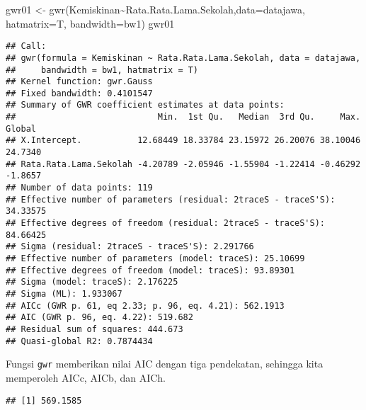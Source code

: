 \documentclass[
]{book}
\newenvironment{Shaded}{\begin{snugshade}}{\end{snugshade}}
\newcommand{\AttributeTok}[1]{\textcolor[rgb]{0.77,0.63,0.00}{#1}}
\newcommand{\FunctionTok}[1]{\textcolor[rgb]{0.00,0.00,0.00}{#1}}
\newcommand{\NormalTok}[1]{#1}
\newcommand{\OtherTok}[1]{\textcolor[rgb]{0.56,0.35,0.01}{#1}}
\newcommand{\SpecialCharTok}[1]{\textcolor[rgb]{0.00,0.00,0.00}{#1}}
\begin{document}
\begin{Shaded}
\begin{Highlighting}[]
\NormalTok{gwr01 }\OtherTok{\textless{}{-}} \FunctionTok{gwr}\NormalTok{(Kemiskinan}\SpecialCharTok{\textasciitilde{}}\NormalTok{Rata.Rata.Lama.Sekolah,}\AttributeTok{data=}\NormalTok{datajawa,}
             \AttributeTok{hatmatrix=}\NormalTok{T, }\AttributeTok{bandwidth=}\NormalTok{bw1)}
\NormalTok{gwr01}
\end{Highlighting}
\end{Shaded}

\begin{verbatim}
## Call:
## gwr(formula = Kemiskinan ~ Rata.Rata.Lama.Sekolah, data = datajawa, 
##     bandwidth = bw1, hatmatrix = T)
## Kernel function: gwr.Gauss 
## Fixed bandwidth: 0.4101547 
## Summary of GWR coefficient estimates at data points:
##                            Min.  1st Qu.   Median  3rd Qu.     Max.  Global
## X.Intercept.           12.68449 18.33784 23.15972 26.20076 38.10046 24.7340
## Rata.Rata.Lama.Sekolah -4.20789 -2.05946 -1.55904 -1.22414 -0.46292 -1.8657
## Number of data points: 119 
## Effective number of parameters (residual: 2traceS - traceS'S): 34.33575 
## Effective degrees of freedom (residual: 2traceS - traceS'S): 84.66425 
## Sigma (residual: 2traceS - traceS'S): 2.291766 
## Effective number of parameters (model: traceS): 25.10699 
## Effective degrees of freedom (model: traceS): 93.89301 
## Sigma (model: traceS): 2.176225 
## Sigma (ML): 1.933067 
## AICc (GWR p. 61, eq 2.33; p. 96, eq. 4.21): 562.1913 
## AIC (GWR p. 96, eq. 4.22): 519.682 
## Residual sum of squares: 444.673 
## Quasi-global R2: 0.7874434
\end{verbatim}

Fungsi \texttt{gwr} memberikan nilai AIC dengan tiga pendekatan, sehingga kita memperoleh AICc, AICb, dan AICh.

\begin{Shaded}
\end{Shaded}

\begin{verbatim}
## [1] 569.1585
\end{verbatim}

\begin{Shaded}
\end{Shaded}
\end{document}
